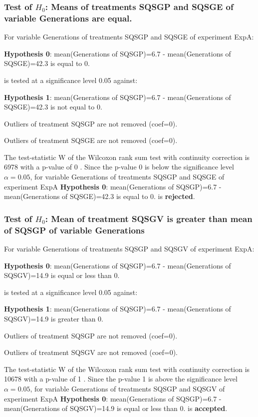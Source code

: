 \documentclass[18pt,c]{beamer}
\begin{document}
\begin{frame}[t]
 \frametitle{Test of $H_{0}$: Means of treatments SQSGP and SQSGE of variable Generations are equal. }
 \scriptsize
 For variable Generations of treatments SQSGP and SQSGE of experiment ExpA:

\vspace{1mm}
{\bf Hypothesis 0}: mean(Generations of SQSGP)=6.7 - mean(Generations of SQSGE)=42.3 is equal to 0.


 \begin{center} is tested at a significance level 0.05 against: \end{center}

{\bf Hypothesis 1}: mean(Generations of SQSGP)=6.7 - mean(Generations of SQSGE)=42.3 is not equal to 0.
\vspace{1mm}
\vspace{1mm}

 Outliers of treatment SQSGP  are not removed (coef=0).

 Outliers of treatment SQSGE  are not removed (coef=0).
\vspace{1mm}
 
 The test-statistic W of the Wilcoxon rank sum test with continuity correction is 6978 with a p-value of 0 .
 Since the p-value 0 is below the significance level $\alpha= 0.05 $,
 for variable Generations of treatments SQSGP and SQSGE of experiment ExpA 
 {\bf Hypothesis 0}: mean(Generations of SQSGP)=6.7 - mean(Generations of SQSGE)=42.3 is equal to 0.
is {\bf rejected}.

 \end{frame}
\begin{frame}[t]
 \frametitle{Test of $H_{0}$: Mean of treatment SQSGV is greater than mean of SQSGP of variable Generations }
 \scriptsize
 For variable Generations of treatments SQSGP and SQSGV of experiment ExpA:

\vspace{1mm}
{\bf Hypothesis 0}: mean(Generations of SQSGP)=6.7 - mean(Generations of SQSGV)=14.9 is equal or less than 0.


 \begin{center} is tested at a significance level 0.05 against: \end{center}

{\bf Hypothesis 1}: mean(Generations of SQSGP)=6.7 - mean(Generations of SQSGV)=14.9 is greater than 0.
\vspace{1mm}
\vspace{1mm}

 Outliers of treatment SQSGP  are not removed (coef=0).

 Outliers of treatment SQSGV  are not removed (coef=0).
\vspace{1mm}
 
 The test-statistic W of the Wilcoxon rank sum test with continuity correction is 10678 with a p-value of 1 .
 Since the p-value 1 is above the significance level $\alpha= 0.05 $,
 for variable Generations of treatments SQSGP and SQSGV of experiment ExpA 
 {\bf Hypothesis 0}: mean(Generations of SQSGP)=6.7 - mean(Generations of SQSGV)=14.9 is equal or less than 0.
is {\bf accepted}.

 \end{frame}
\end{document}
